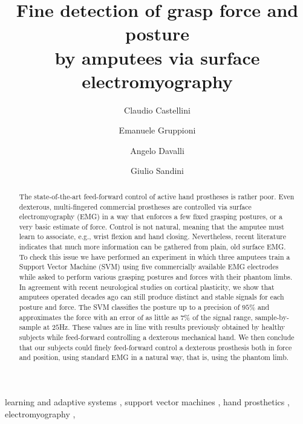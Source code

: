 \documentclass[review,authoryear]{elsarticle}
\begin{document}
\begin{frontmatter}

\title{Fine detection of grasp force and posture\\
by amputees via surface electromyography}

\author[liralab]{Claudio Castellini}
\author[inail]{Emanuele Gruppioni}
\author[inail]{Angelo Davalli}
\author[iit]{Giulio Sandini}

\address[liralab]{LIRA-Lab, University of Genova,
  viale F. Causa 13, 16145 Genova (Italy)}
\address[inail]{INAIL Centro Protesi,
  via Rabuina 14, 40054 Vigorso di Budrio (Bologna, Italy)}
\address[iit]{RBCS Department, Italian Institute of Technology,
  via Morego 30, 16163 Genova (Italy)}


\begin{abstract}

The state-of-the-art feed-forward control of active hand prostheses
is rather poor. Even dexterous, multi-fingered commercial prostheses are
controlled via surface electromyography (EMG) in a way that enforces
a few fixed grasping postures, or a very basic estimate of force.
Control is not natural, meaning that the amputee must learn to associate,
e.g., wrist flexion and hand closing. Nevertheless, recent literature
indicates that much more information can be gathered from plain, old
surface EMG. To check this issue we have performed an experiment in
which three amputees train a Support Vector Machine (SVM) using five
commercially available EMG electrodes while asked to perform various
grasping postures and forces with their phantom limbs. In agreement
with recent neurological studies on cortical plasticity, we show that
amputees operated decades ago can still produce distinct and stable
signals for each posture and force. The SVM classifies the posture up
to a precision of $95\%$ and approximates the force with an error of
as little as $7\%$ of the signal range, sample-by-sample at $25$Hz.
These values are in line with results previously obtained by healthy
subjects while feed-forward controlling a dexterous mechanical hand.
We then conclude that our subjects could finely feed-forward control
a dexterous prosthesis both in force and position, using standard EMG
in a natural way, that is, using the phantom limb.

\end{abstract}

\begin{keyword}
  learning and adaptive systems \sep
  support vector machines \sep
  hand prosthetics \sep
  electromyography \sep  
\end{keyword}

\end{frontmatter}
\end{document}
